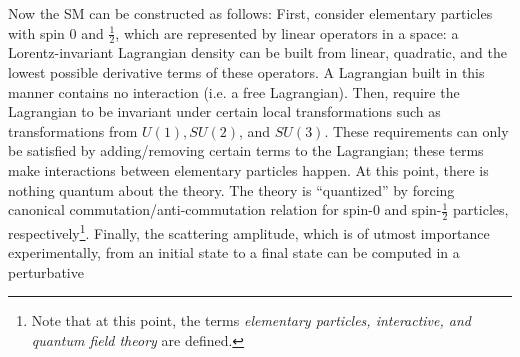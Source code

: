 Now the SM can be constructed as follows:
First, consider elementary particles with spin $0$ and $\frac{1}{2}$,
which are represented by linear operators in a space:
a Lorentz-invariant Lagrangian density can be built from
linear, quadratic, and the lowest possible derivative terms of these
operators.
A Lagrangian built in this manner contains no interaction (i.e. a free
Lagrangian).
Then, require the Lagrangian to be invariant under certain local transformations
such as transformations from $U(1), SU(2)$, and $SU(3)$.
These requirements can only be satisfied by adding/removing certain terms to
the Lagrangian;
these terms make interactions between elementary particles happen.
At this point, there is nothing quantum about the theory.
The theory is ``quantized'' by forcing canonical commutation/anti-commutation
relation for spin-0 and spin-$\frac{1}{2}$ particles, respectively\footnote{
    Note that at this point, the terms
    \emph{elementary particles, interactive, and quantum field theory}
    are defined.
}.
Finally, the scattering amplitude,
which is of utmost importance experimentally,
from an initial state to a final state can be computed in a perturbative
